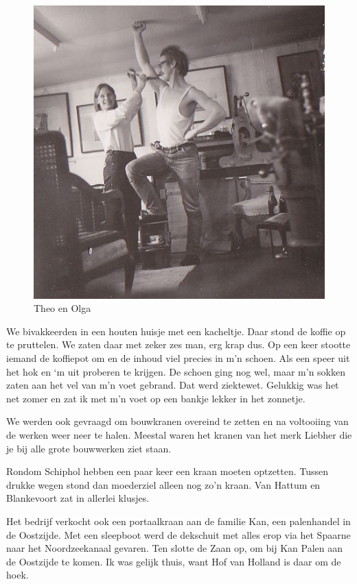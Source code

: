 \documentclass[10pt,twoside, openright]{memoir}
\begin{document}
\begin{figure}
\includegraphics[width=\textwidth]{img/223TheoenOlga.jpg}
\caption*{\footnotesize Theo en Olga}
\end{figure}

We bivakkeerden in een houten huisje met een kacheltje. Daar stond de koffie op te pruttelen. We zaten daar met zeker zes man, erg krap dus. Op een keer stootte iemand de koffiepot om en de inhoud viel precies in m'n schoen. Als een speer uit het hok en `m uit proberen te krijgen. De schoen ging nog wel, maar m'n sokken zaten aan het vel van m'n voet gebrand. Dat werd ziektewet. Gelukkig was het net zomer en zat ik met m'n voet op een bankje lekker in het zonnetje.

We werden ook gevraagd om bouwkranen overeind te zetten en na voltooiing van de werken weer neer te halen. Meestal waren het kranen van het merk Liebher die je bij alle grote bouwwerken ziet staan. 

Rondom Schiphol hebben een paar keer een kraan moeten optzetten. Tussen drukke wegen stond dan moederziel alleen nog zo’n kraan. Van Hattum en Blankevoort zat in allerlei klusjes.

Het bedrijf verkocht ook een portaalkraan aan de familie Kan, een palenhandel in de Oostzijde. Met een sleepboot werd de dekschuit met alles erop via het Spaarne naar het Noordzeekanaal gevaren. Ten slotte de Zaan op, om bij Kan Palen aan de Oostzijde te komen. Ik was gelijk thuis, want Hof van Holland is daar om de hoek. 
\end{document}
